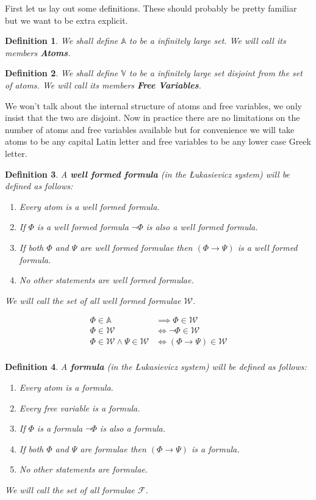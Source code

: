 \documentclass{article}
\newtheorem{defin}{Definition}
\begin{document}
First let us lay out some definitions.
These should probably be pretty familiar but we want to be extra explicit.

\begin{defin}
We shall define $\mathbb{A}$ to be a infinitely large set.
We will call its members \textbf{Atoms}.
\end{defin}

\begin{defin}
We shall define $\mathbb{V}$ to be a infinitely large set disjoint from the set of atoms.
We will call its members \textbf{Free Variables}.
\end{defin}

We won't talk about the internal structure of atoms and free variables, we only insist that the two are disjoint.
Now in practice there are no limitations on the number of atoms and free variables available but for convenience we will take atoms to be any capital Latin letter and free variables to be any lower case Greek letter.

\begin{defin}
A \textbf{well formed formula} (in the \L ukasievicz system) will be defined as follows:
\begin{enumerate}
\item Every atom is a well formed formula.
\item If $\Phi$ is a well formed formula $\neg\Phi$ is also a well formed formula.
\item If both $\Phi$ and $\Psi$ are well formed formulae then $(\Phi\rightarrow\Psi)$ is a well formed formula.
\item No other statements are well formed formulae.
\end{enumerate}
We will call the set of all well formed formulae $\mathcal{W}$.

\begin{align*}
\Phi \in \mathbb{A} &\implies \Phi \in \mathcal{W} \\
\Phi \in \mathcal{W} &\iff \neg\Phi \in \mathcal{W} \\
\Phi \in \mathcal{W}\land \Psi \in \mathcal{W} &\iff (\Phi \rightarrow \Psi) \in \mathcal{W} \\
\end{align*}
\end{defin}


\begin{defin}
A \textbf{formula} (in the \L ukasievicz system) will be defined as follows:
\begin{enumerate}
\item Every atom is a formula.
\item Every free variable is a formula.
\item If $\Phi$ is a formula $\neg\Phi$ is also a formula.
\item If both $\Phi$ and $\Psi$ are formulae then $(\Phi\rightarrow\Psi)$ is a formula.
\item No other statements are formulae.
\end{enumerate}
We will call the set of all formulae $\mathcal{F}$.
\end{defin}
\end{document}
